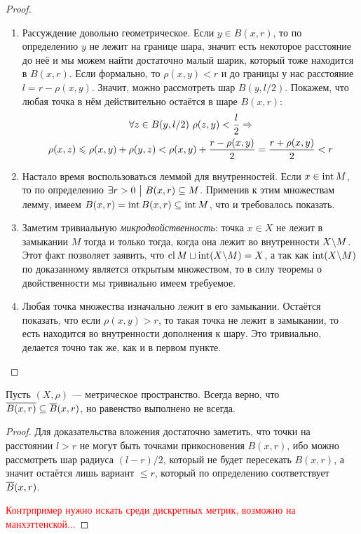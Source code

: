 \begin{proof}~
	\begin{enumerate}
		\item Рассуждение довольно геометрическое. Если $y \in B(x, r)$, то по определению $y$ не лежит на границе шара, значит есть некоторое расстояние до неё и мы можем найти достаточно малый шарик, который тоже находится в $B(x, r)$. Если формально, то $\rho(x, y) < r$ и до границы у нас расстояние $l = r - \rho(x, y)$. Значит, можно рассмотреть шар $B(y, l / 2)$. Покажем, что любая точка в нём действительно остаётся в шаре $B(x, r)$:
		\begin{multline*}
			\forall z \in B(y, l / 2)\ \rho(z, y) < \frac{l}{2} \Rightarrow
			\\
			\rho(x, z) \leqslant \rho(x, y) + \rho(y, z) < \rho(x, y) + \frac{r - \rho(x, y)}{2} = \frac{r + \rho(x, y)}{2} < r
		\end{multline*}
		
		\item Настало время воспользоваться леммой для внутренностей. Если $x \in \operatorname{int} M$, то по определению $\exists r > 0 \ \big|\  B(x, r) \subseteq M$. Применив к этим множествам лемму, имеем $B(x, r) = \operatorname{int} B(x, r) \subseteq \operatorname{int} M$, что и требовалось показать.
		
		\item Заметим тривиальную \textit{микродвойственность}: точка $x \in X$ не лежит в замыкании $M$ тогда и только тогда, когда она лежит во внутренности $X \backslash M$. Этот факт позволяет заявить, что $\operatorname{cl} M \sqcup \operatorname{int} (X \backslash M) = X$, а так как $\operatorname{int} (X \backslash M)$ по доказанному является открытым множеством, то в силу теоремы о двойственности мы тривиально имеем требуемое.
		
		\item Любая точка множества изначально лежит в его замыкании. Остаётся показать, что если $\rho(x, y) > r$, то такая точка не лежит в замыкании, то есть находится во внутренности дополнения к шару. Это тривиально, делается точно так же, как и в первом пункте.
	\end{enumerate}
\end{proof}

\begin{proposition}
	Пусть $(X, \rho)$ --- метрическое пространство. Всегда верно, что \\ $\overline{B(x, r)} \subseteq \overline{B}(x, r)$, но равенство выполнено не всегда.
\end{proposition}

\begin{proof}
	Для доказательства вложения достаточно заметить, что точки на расстоянии $l > r$ не могут быть точками прикосновения $B(x, r)$, ибо можно рассмотреть шар радиуса $(l - r) / 2$, который не будет пересекать $B(x, r)$, а значит остаётся лишь вариант $\le r$, который по определению соответствует $\overline{B}(x, r)$.
	
	\textcolor{red}{Контрпример нужно искать среди дискретных метрик, возможно на манхэттенской...}
\end{proof}

